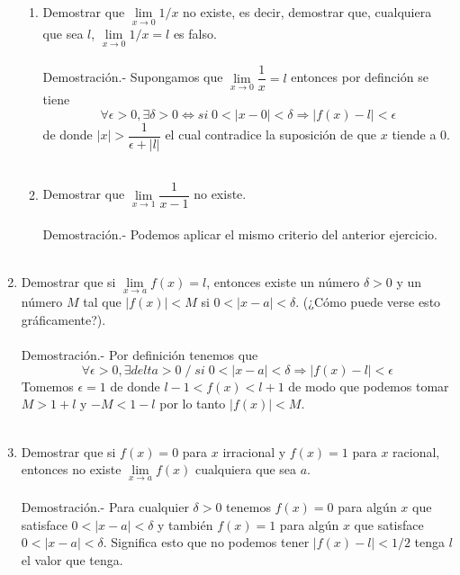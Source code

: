 \begin{enumerate}
\begin{enumerate}[\bfseries (a)]
    \item Demostrar que $\lim\limits_{x\to 0} 1/x$ no existe, es decir, demostrar que, cualquiera que sea $l$, $\lim\limits_{x\to 0} 1/x = l$ es falso.\\\\ 
	Demostración.-\; Supongamos que $\lim\limits_{x\to 0} \dfrac{1}{x} = l$ entonces por definción se tiene $$\forall \epsilon>0, \exists \delta >0 \Longleftrightarrow si \; 0<|x-0|<\delta \Longrightarrow |f(x)-l|<\epsilon$$ 
	de donde $|x| > \dfrac{1}{\epsilon+|l|}$ el cual contradice la suposición de que $x$ tiende a $0$.\\\\ 

    \item Demostrar que $\lim\limits_{x\to 1}\dfrac{1}{x-1}$ no existe.\\\\
	Demostración.-\; Podemos aplicar el mismo criterio del anterior ejercicio.\\\\

\end{enumerate}

\item Demostrar que si $\lim\limits_{x\to a} f(x)=l$, entonces existe un número $\delta>0$ y un número $M$ tal que $|f(x)|<M$ si $0<|x-a|<\delta$. (¿Cómo puede verse esto gráficamente?).\\\\
    Demostración.-\; Por definición tenemos que $$\forall \epsilon>0, \exists delta>0 \; / \; si \; 0<|x-a|<\delta \Longrightarrow |f(x)-l|<\epsilon$$
    Tomemos $\epsilon = 1$ de donde $l-1<f(x)<l+1$ de modo que podemos tomar $M>1+l$ y $-M<1-l$ por lo tanto $|f(x)|<M$.\\\\

\item Demostrar que si $f(x)=0$ para $x$ irracional y $f(x)=1$ para $x$ racional, entonces no existe $\lim\limits_{x\to a} f(x)$ cualquiera que sea $a$.\\\\
    Demostración.-\; Para cualquier $\delta > 0$ tenemos $f(x)=0$ para algún $x$ que satisface $0<|x-a|<\delta$ y también $f(x)=1$ para algún $x$ que satisface $0<|x-a|<\delta$. Significa esto que no podemos tener $|f(x)-l|<1/2$ tenga $l$ el valor que tenga.\\\\


\end{enumerate}

